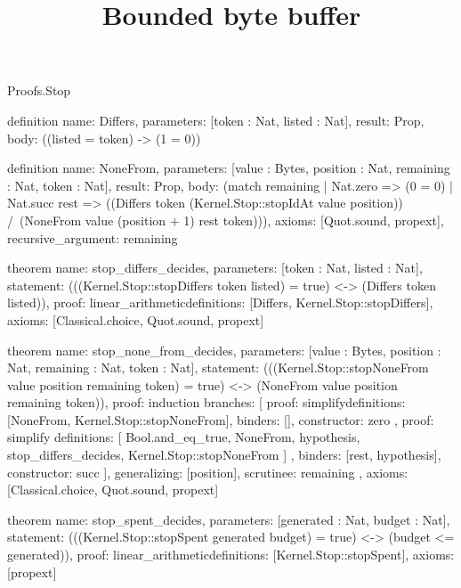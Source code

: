 \begin{lexlean}{Proofs.Stop}
\title{Bounded byte buffer}
\begin{semanticmodule}
definition{
  name: Differs,
  parameters: [token : Nat, listed : Nat],
  result: Prop,
  body: ((listed = token) -> (1 = 0))
}

definition{
  name: NoneFrom,
  parameters: [value : Bytes, position : Nat, remaining : Nat, token : Nat],
  result: Prop,
  body: (match remaining
    | Nat.zero => (0 = 0)
    | Nat.succ rest => ((Differs token (Kernel.Stop::stopIdAt value position)) /\ (NoneFrom value (position + 1) rest token))),
  axioms: [Quot.sound, propext],
  recursive_argument: remaining
}

theorem{
  name: stop_differs_decides,
  parameters: [token : Nat, listed : Nat],
  statement: (((Kernel.Stop::stopDiffers token listed) = true) <-> (Differs token listed)),
  proof: linear_arithmetic{definitions: [Differs, Kernel.Stop::stopDiffers]},
  axioms: [Classical.choice, Quot.sound, propext]
}

theorem{
  name: stop_none_from_decides,
  parameters: [value : Bytes, position : Nat, remaining : Nat, token : Nat],
  statement: (((Kernel.Stop::stopNoneFrom value position remaining token) = true) <-> (NoneFrom value position remaining token)),
  proof: induction{
    branches: [
      {
        proof: simplify{definitions: [NoneFrom, Kernel.Stop::stopNoneFrom]},
        binders: [],
        constructor: zero
      },
      {
        proof: simplify{
          definitions: [
            Bool.and_eq_true,
            NoneFrom,
            hypothesis,
            stop_differs_decides,
            Kernel.Stop::stopNoneFrom
          ]
        },
        binders: [rest, hypothesis],
        constructor: succ
      }
    ],
    generalizing: [position],
    scrutinee: remaining
  },
  axioms: [Classical.choice, Quot.sound, propext]
}

theorem{
  name: stop_spent_decides,
  parameters: [generated : Nat, budget : Nat],
  statement: (((Kernel.Stop::stopSpent generated budget) = true) <-> (budget <= generated)),
  proof: linear_arithmetic{definitions: [Kernel.Stop::stopSpent]},
  axioms: [propext]
}
\end{semanticmodule}
\end{lexlean}

